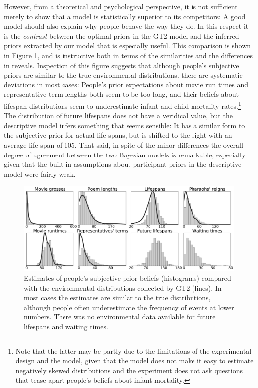 However, from a theoretical and psychological perspective, it is not sufficient merely to show that a model is statistically superior to its competitors: A good model should also explain why people behave the way they do. In this respect it is the {\it contrast} between the optimal priors in the GT2 model and the inferred priors extracted by our model that is especially useful. This comparison is shown in Figure \ref{fig:predictions-priors-subjective-vs-empirical}, and is instructive both in terms of the similarities and the differences in reveals. Inspection of this figure suggests that although people's subjective priors are similar to the true environmental distributions, there are systematic deviations in most cases: People's prior expectations about movie run times and representative term lengths both seem to be too long, and their beliefs about lifespan distributions seem to underestimate infant and child mortality rates.\footnote{Note that the latter may be partly due to the limitations of the experimental design and the model, given that the model does not make it easy to estimate negatively skewed distributions and the experiment does not ask questions that tease apart people's beliefs about infant mortality.} The distribution of future lifespans does not have a veridical value, but the descriptive model infers something that seems sensible: It has a similar form to the subjective prior for actual life spans, but is shifted to the right with an average life span of 105. That said, in spite of the minor differences the overall degree of agreement between the two Bayesian models is remarkable, especially given that the built in assumptions about participant priors in the descriptive model were fairly weak.


\begin{figure}[t]
	\includegraphics[width=1.0\textwidth]{predictions_figures/priors-subjective-vs-empirical.pdf}
	\caption{Estimates of people's subjective prior beliefs (histograms) compared with the environmental distributions collected by GT2 (lines). In most cases the estimates are similar to the true distributions, although people often underestimate the frequency of events at lower numbers. There was no environmental data available for future lifespans and waiting times.}
	\label{fig:predictions-priors-subjective-vs-empirical}
\end{figure}



